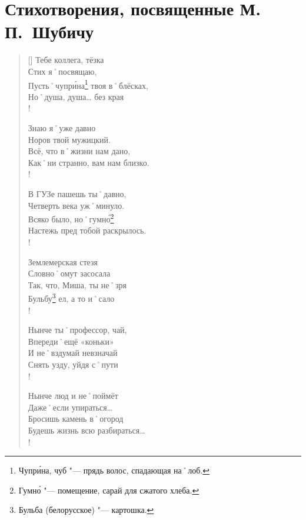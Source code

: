 ﻿\section{Стихотворения, посвященные М.\,П.~Шубичу}

\begin{verse}[\versewidth]
Тебе коллега, тёзка           \\
Стих я˚посвящаю,               \\
Пусть˚чупр\'{и}на\footnote{Чупр\'{и}на, чуб "--- прядь волос, спадающая на˚лоб.} твоя в˚блёсках, \\
Но˚душа, душа… без края \\!

\vin Знаю я˚уже давно               \\						%
\vin Норов твой мужицкий.            \\
\vin Всё, что в˚жизни нам дано,      \\
\vin Как˚ни странно, вам нам близко. \\!

В ГУЗе пашешь ты˚давно,         \\
Четверть века уж˚минуло.        \\
Всяко было, но˚гумн\'{о}\footnote{Гумн\'{о} "--- помещение, сарай для сжатого хлеба.}           \\
Настежь пред тобой раскрылось. \\!

\vin Землемерская стезя             \\
\vin Словно˚омут засосала           \\
\vin Так, что, Миша, ты не˚зря        \\
\vin Бульбу\footnote{Бульба (белорусское) "--- картошка.} ел, а то и˚сало \\!

Нынче ты˚профессор, чай,        \\
Впереди˚ещё «коньки»             \\
И не˚вздумай невзначай         \\
Снять узду, уйдя с˚пути  				\\!

\vin Нынче люд и не˚поймёт          \\
\vin Даже˚если упираться…         \\
\vin Бросишь камень в˚огород        \\
\vin Будешь жизнь всю разбираться… \\!


\end{verse}
